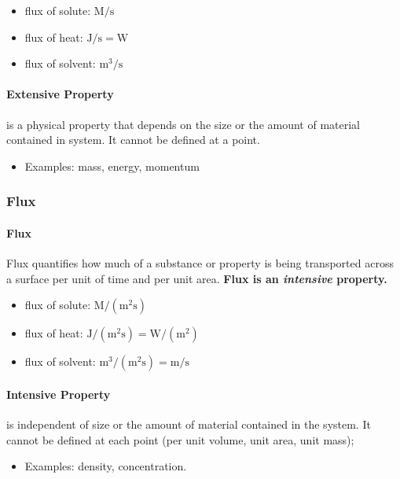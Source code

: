 \documentclass[12pt, a4paper]{article}
\begin{document}
\begin{tcolorbox}[breakable, title = \textbf{Typical Units of Flows}]
    \begin{itemize}
        \item flux of solute: $\displaystyle \mathrm{M/s}$
        \item flux of heat: $\displaystyle \mathrm{J/s = W}$
        \item flux of solvent: $\displaystyle \mathrm{m^{3}/s}$
    \end{itemize}
\end{tcolorbox}

\paragraph{Extensive Property} is a physical property that depends on the size or the amount of material contained in system. It cannot be defined at a point.
\begin{itemize}
 \item Examples: mass, energy, momentum
\end{itemize}


\subsubsection{Flux}
\paragraph{Flux} Flux quantifies how much of a substance or property is being transported across a surface per unit of time and per unit area. \textbf{Flux is an \emph{intensive} property.}

\begin{tcolorbox}[breakable, title = \textbf{Typical Units of Fluxes}]
    \begin{itemize}
        \item flux of solute: $\displaystyle \mathrm{M/(m^{2}s)}$
        \item flux of heat: $\displaystyle \mathrm{J/(m^{2}s) = W/(m^{2})}$
        \item flux of solvent: $\displaystyle \mathrm{m^{3}/(m^{2}s) = m/s}$
    \end{itemize}
\end{tcolorbox}

\paragraph{Intensive Property} is independent of size or the amount of material contained in the system. It cannot be defined at each point (per unit volume, unit area, unit mass);
\begin{itemize}
    \item Examples: density, concentration.
\end{itemize}
\end{document}
